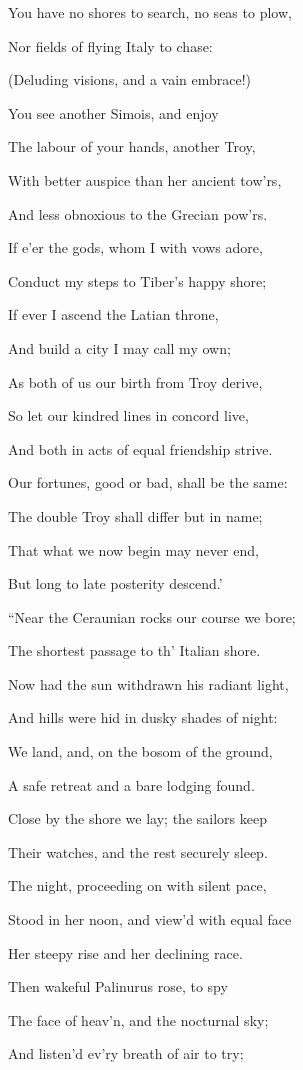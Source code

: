 You have no shores to search, no seas to plow,

Nor fields of flying Italy to chase:

(Deluding visions, and a vain embrace!)

You see another Simois, and enjoy

The labour of your hands, another Troy,

With better auspice than her ancient tow’rs,

And less obnoxious to the Grecian pow’rs.

If e’er the gods, whom I with vows adore,

Conduct my steps to Tiber’s happy shore;

If ever I ascend the Latian throne,

And build a city I may call my own;

As both of us our birth from Troy derive,

So let our kindred lines in concord live,

And both in acts of equal friendship strive.

Our fortunes, good or bad, shall be the same:

The double Troy shall differ but in name;

That what we now begin may never end,

But long to late posterity descend.’

“Near the Ceraunian rocks our course we bore;

The shortest passage to th’ Italian shore.

Now had the sun withdrawn his radiant light,

And hills were hid in dusky shades of night:

We land, and, on the bosom of the ground,

A safe retreat and a bare lodging found.

Close by the shore we lay; the sailors keep

Their watches, and the rest securely sleep.

The night, proceeding on with silent pace,

Stood in her noon, and view’d with equal face

Her steepy rise and her declining race.

Then wakeful Palinurus rose, to spy

The face of heav’n, and the nocturnal sky;

And listen’d ev’ry breath of air to try;

